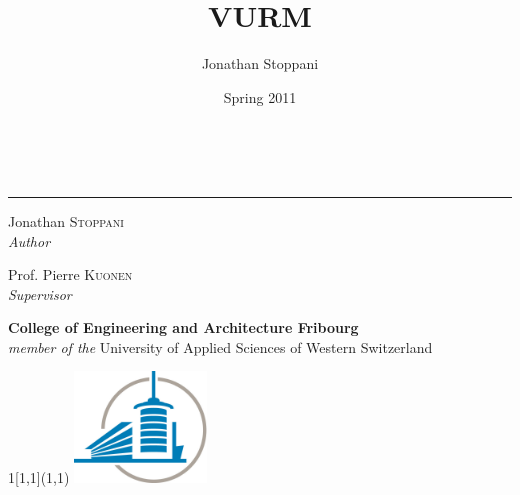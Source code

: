 \title{VURM}
\author{Jonathan Stoppani}
\date{Spring 2011}

\begin{titlepage}

\vspace*{2cm}
\begin{center}


\vspace*{1cm}{\huge  VURM}\\[0.3cm]

\end{center}
\rule{\linewidth}{0.75pt}

\vspace*{2.5cm}

\noindent\begin{minipage}{0.5\textwidth}
	\begin{flushleft} \Large
		Jonathan \textsc{Stoppani}\\[.1cm]
		\large\emph{Author}
	\end{flushleft}
\end{minipage}
\begin{minipage}{0.5\textwidth}
	\begin{flushright} \Large
		Prof. Pierre \textsc{Kuonen}\\[.1cm]
		\large\emph{Supervisor} \\
	\end{flushright}
\end{minipage}

\vfill


\vfill

\noindent \textbf{College of Engineering and Architecture Fribourg}\\[.1cm]
\textit{member of the} University of Applied Sciences of Western Switzerland

\vspace*{.433cm}

\setlength{\TPHorizModule}{\paperwidth - (.5\paperwidth - .5\textwidth)}
\setlength{\TPVertModule}{\paperheight - (.5\paperheight - .5\textheight)}
\begin{textblock}{1}[1,1](1,1)
\includegraphics[width=100pt]{figures/logo-cropped}
\end{textblock}

\end{titlepage}

